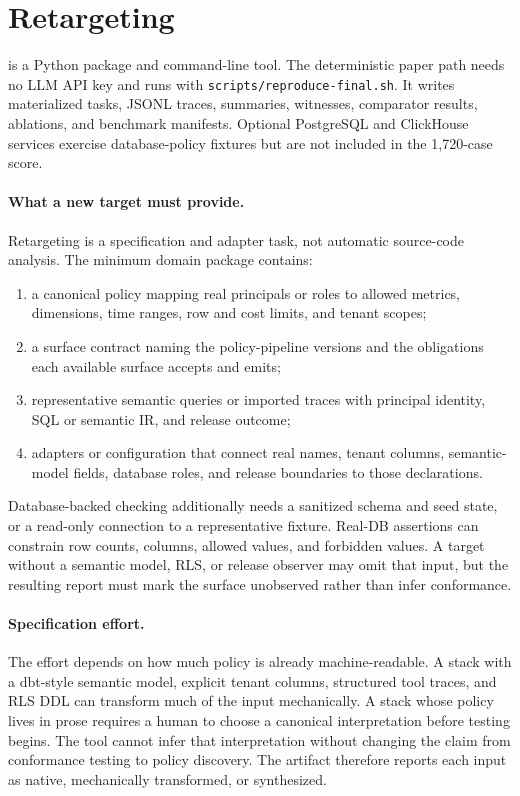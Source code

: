 \section{Retargeting \policystrata}

\policystrata{} is a Python package and command-line tool. The deterministic paper path needs no LLM API key and runs with \texttt{scripts/reproduce-final.sh}. It writes materialized tasks, JSONL traces, summaries, witnesses, comparator results, ablations, and benchmark manifests. Optional PostgreSQL and ClickHouse services exercise database-policy fixtures but are not included in the 1,720-case score.

\paragraph{What a new target must provide.}
Retargeting is a specification and adapter task, not automatic source-code analysis. The minimum domain package contains:

\begin{enumerate}
  \item a canonical policy mapping real principals or roles to allowed metrics, dimensions, time ranges, row and cost limits, and tenant scopes;
  \item a surface contract naming the policy-pipeline versions and the obligations each available surface accepts and emits;
  \item representative semantic queries or imported traces with principal identity, SQL or semantic IR, and release outcome;
  \item adapters or configuration that connect real names, tenant columns, semantic-model fields, database roles, and release boundaries to those declarations.
\end{enumerate}

Database-backed checking additionally needs a sanitized schema and seed state, or a read-only connection to a representative fixture. Real-DB assertions can constrain row counts, columns, allowed values, and forbidden values. A target without a semantic model, RLS, or release observer may omit that input, but the resulting report must mark the surface unobserved rather than infer conformance.

\paragraph{Specification effort.}
The effort depends on how much policy is already machine-readable. A stack with a dbt-style semantic model, explicit tenant columns, structured tool traces, and RLS DDL can transform much of the input mechanically. A stack whose policy lives in prose requires a human to choose a canonical interpretation before testing begins. The tool cannot infer that interpretation without changing the claim from conformance testing to policy discovery. The artifact therefore reports each input as native, mechanically transformed, or synthesized.

